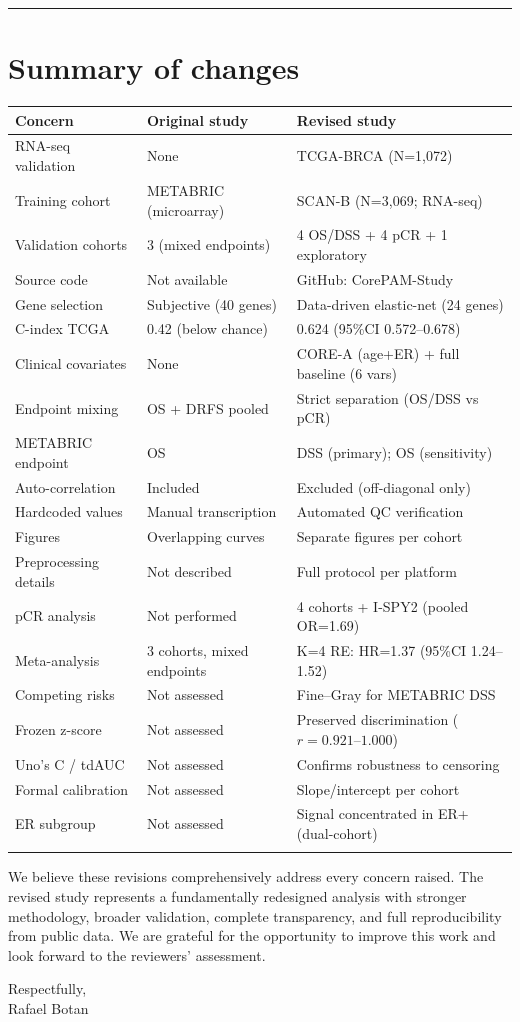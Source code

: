 \documentclass[11pt]{article}
\begin{document}
\bigskip\hrule\bigskip

\section*{Summary of changes}

\begin{tabular}{@{}p{3.5cm}p{4.5cm}p{5.5cm}@{}}
\toprule
Concern & Original study & Revised study \\
\midrule
RNA-seq validation & None & TCGA-BRCA (N=1,072) \\
Training cohort & METABRIC (microarray) & SCAN-B (N=3,069; RNA-seq) \\
Validation cohorts & 3 (mixed endpoints) & 4 OS/DSS + 4 pCR + 1 exploratory \\
Source code & Not available & GitHub: CorePAM-Study \\
Gene selection & Subjective (40 genes) & Data-driven elastic-net (24 genes) \\
C-index TCGA & 0.42 (below chance) & 0.624 (95\%CI 0.572--0.678) \\
Clinical covariates & None & CORE-A (age+ER) + full baseline (6 vars) \\
Endpoint mixing & OS + DRFS pooled & Strict separation (OS/DSS vs pCR) \\
METABRIC endpoint & OS & DSS (primary); OS (sensitivity) \\
Auto-correlation & Included & Excluded (off-diagonal only) \\
Hardcoded values & Manual transcription & Automated QC verification \\
Figures & Overlapping curves & Separate figures per cohort \\
Preprocessing details & Not described & Full protocol per platform \\
pCR analysis & Not performed & 4 cohorts + I-SPY2 (pooled OR=1.69) \\
Meta-analysis & 3 cohorts, mixed endpoints & K=4 RE: HR=1.37 (95\%CI 1.24--1.52) \\
Competing risks & Not assessed & Fine--Gray for METABRIC DSS \\
Frozen z-score & Not assessed & Preserved discrimination ($r = 0.921$--$1.000$) \\
Uno's C / tdAUC & Not assessed & Confirms robustness to censoring \\
Formal calibration & Not assessed & Slope/intercept per cohort \\
ER subgroup & Not assessed & Signal concentrated in ER+ (dual-cohort) \\
\botrule
\end{tabular}

\bigskip

We believe these revisions comprehensively address every concern raised. The revised study represents a fundamentally redesigned analysis with stronger methodology, broader validation, complete transparency, and full reproducibility from public data. We are grateful for the opportunity to improve this work and look forward to the reviewers' assessment.

\bigskip

\noindent Respectfully,\\
Rafael Botan
\end{document}
